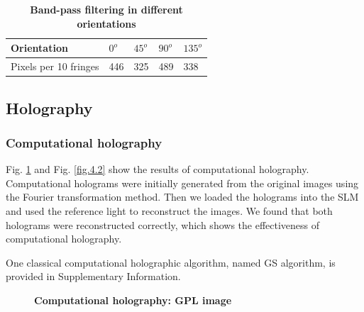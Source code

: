 \documentclass[10pt,a4paper,twocolumn,twoside,UTF8]{article}
\begin{document}
		\begin{table}[htbp]
			\centering
			\caption{\textbf{Band-pass filtering in different orientations}}
			\label{tab.3.1}
				\begin{tabular}{lllll}
					\toprule
					Orientation &$0^{o}$ & $45^{o}$ &$90^{o}$ & $135^{o}$ \\
					\midrule
					Pixels per 10 fringes & 446 & 325 &489 & 338 \\
					\bottomrule
				\end{tabular}
		\end{table}

	\subsection{Holography}
		\subsubsection{Computational holography}
		Fig. \ref{fig.4.1} and Fig. \ref{fig.4.2} show the results of computational holography. 
		Computational holograms were initially generated from the original images using the Fourier transformation method.
		Then we loaded the holograms into the SLM and used the reference light to reconstruct the images.
		We found that both holograms were reconstructed correctly, which shows the effectiveness of computational holography.

		One classical computational holographic algorithm, named GS algorithm, is provided in Supplementary Information.

		\begin{figure}[htbp]
			\centering
			\caption{\textbf{Computational holography: GPL image}}
			\label{fig.4.1}
		\end{figure}
\end{document}
